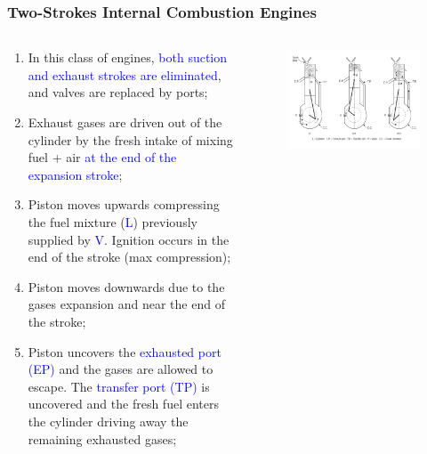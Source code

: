 \documentclass[10pt,compress]{beamer}
\newcommand{\blue}{\textcolor{blue}}
\begin{document}
\begin{frame}
 \frametitle{Two-Strokes Internal Combustion Engines}
  \begin{columns}
   \begin{column}[c]{0.5\linewidth}
    \begin{enumerate}[(1)]\scriptsize
     \item<1-> In this class of engines, \blue{both suction and exhaust strokes are eliminated}, and valves are replaced by ports;
     \item<2-> Exhaust gases are driven out of the cylinder by the fresh intake of mixing fuel + air \blue{at the end of the expansion stroke};
     \item<3-> Piston moves upwards compressing the fuel mixture (\textcolor{blue}{L}) previously supplied by \textcolor{blue}{V}. Ignition occurs in the end of the stroke (max compression);
     \item<4-> Piston moves downwards due to the gases expansion and near the end of the stroke; 
     \item<5-> Piston uncovers the \textcolor{blue}{exhausted port (EP)} and the gases are allowed to escape. The \textcolor{blue}{transfer port (TP)} is uncovered and the fresh fuel enters the cylinder driving away the remaining exhausted gases;
    \end{enumerate}
   \end{column}
   \begin{column}[c]{0.5\linewidth}
    \begin{figure}%
     \begin{center}
      \includegraphics[width=6.cm,clip]{./Pics/InternalCombustion_2Strokes_Otto}
     \end{center}
    \end{figure}  
   \end{column}  
  \end{columns}
\vspace{0.5cm}\begin{center}\scriptsize
{}\end{center}
\end{frame}
\end{document}
